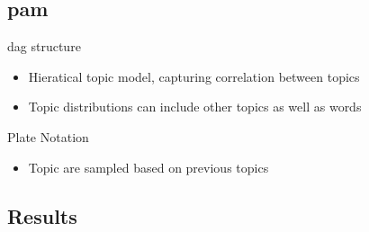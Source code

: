 \subsection{\acrlong{pam}}

\begin{frame}{\insertsubsection}{\gls{dag} structure}
    \begin{itemize}
    	\item<1-> Hieratical topic model, capturing correlation between topics
    	\item<2-> Topic distributions can include other topics as well as words
    \end{itemize}
	
\end{frame}

\begin{frame}{\insertsubsection}{Plate Notation}
	\begin{figure}
			\centering
			\resizebox{0.45\columnwidth}{!}{%
			
			}
	\end{figure}
	\begin{itemize}
		\item Topic are sampled based on previous topics
	\end{itemize}
\end{frame}

\subsection{Results}

